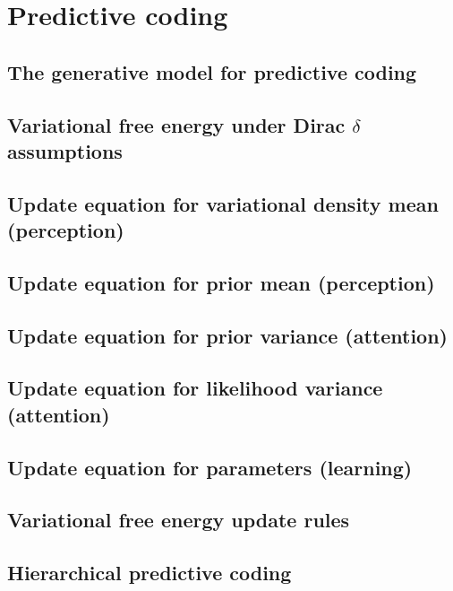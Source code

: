 \chapter{Predictive coding}

\section{The generative model for predictive coding}
\section{Variational free energy under Dirac $\delta$ assumptions}
\section{Update equation for variational density mean (perception)}
\section{Update equation for prior mean (perception)}
\section{Update equation for prior variance (attention)}
\section{Update equation for likelihood variance (attention)}
\section{Update equation for parameters (learning)}
\section{Variational free energy update rules}
\section{Hierarchical predictive coding}
